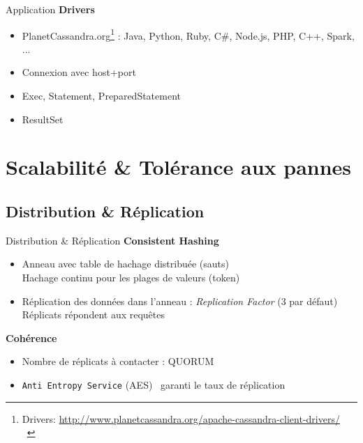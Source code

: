 \begin{frame}[fragile]{Application}
\textbf{Drivers}
\begin{itemize}
	\item PlanetCassandra.org\footnote{Drivers: \url{http://www.planetcassandra.org/apache-cassandra-client-drivers/}\\~} : 	Java, Python, Ruby, C\#, Node.js, PHP, C++, Spark, ...
	\item Connexion avec host+port
	\item Exec, Statement, PreparedStatement
	\item ResultSet
\end{itemize}
\end{frame}

\section[Scalable]{Scalabilité \& Tolérance aux pannes}
\subsection{Distribution \& Réplication}
\begin{frame}[fragile]{Distribution \& Réplication}
\textbf{Consistent Hashing}
\begin{itemize}
	\item Anneau avec table de hachage distribuée (sauts)\\
	Hachage continu pour les plages de valeurs (token)
	\item Réplication des données dans l'anneau : \textit{Replication Factor} (3 par défaut)\\
	Réplicats répondent aux requêtes
\end{itemize}
\textbf{Cohérence}
\begin{itemize}
	\item Nombre de réplicats à contacter : \textsc{QUORUM}
	\item \texttt{Anti Entropy Service} (AES) \Rightarrow ~garanti le taux de réplication
\end{itemize}
\end{frame}

